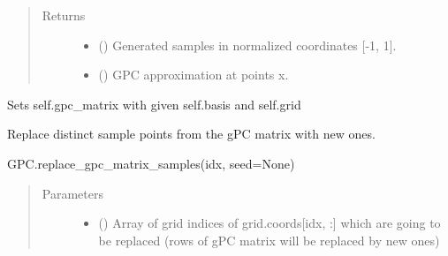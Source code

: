 \documentclass[letterpaper,10pt,english,openany,oneside]{sphinxmanual}
\begin{document}
\begin{fulllineitems}
\begin{fulllineitems}
\begin{quote}
\begin{description}
\begin{itemize}
\end{itemize}

\item[{Returns}] \leavevmode
\begin{itemize}
\item {} 
 () \textendash{} Generated samples in normalized coordinates {[}-1, 1{]}.

\item {} 
 () \textendash{} GPC approximation at points x.

\end{itemize}


\end{description}\end{quote}

\end{fulllineitems}


\begin{fulllineitems}
\label{\detokenize{pygpc:pygpc.GPC.GPC.init_gpc_matrix}}
Sets self.gpc\_matrix with given self.basis and self.grid

\end{fulllineitems}


\begin{fulllineitems}
\label{\detokenize{pygpc:pygpc.GPC.GPC.replace_gpc_matrix_samples}}
Replace distinct sample points from the gPC matrix with new ones.

GPC.replace\_gpc\_matrix\_samples(idx, seed=None)
\begin{quote}\begin{description}
\item[{Parameters}] \leavevmode\begin{itemize}
\item {} 
 (\sphinxstyleliteralemphasis{\sphinxupquote{ {[}}}\sphinxstyleliteralemphasis{\sphinxupquote{{]}}}) \textendash{} Array of grid indices of grid.coords{[}idx, :{]} which are going to be replaced
(rows of gPC matrix will be replaced by new ones)


\end{itemize}
\end{description}
\end{quote}
\end{fulllineitems}
\end{fulllineitems}
\end{document}
